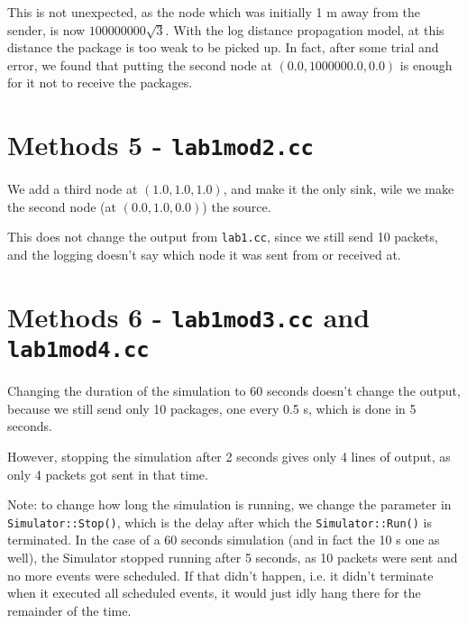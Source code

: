 \documentclass[11pt,journal]{article}
\begin{document}
	This is not unexpected, as the node which was initially 1 m away from the sender, is now $100000000 \sqrt{3}$. With the log distance propagation model, at this distance the package is too weak to be picked up. In fact, after some trial and error, we found that putting the second node at $(0.0,1000000.0, 0.0)$ is enough for it not to receive the packages.
	
	\section{Methods 5 - \texttt{lab1mod2.cc}}
	We add a third node at $(1.0, 1.0, 1.0)$, and make it the only sink, wile we make the second node (at $(0.0, 1.0, 0.0)$) the source.
	
	This does not change the output from \texttt{lab1.cc}, since we still send 10 packets, and the logging doesn't say which node it was sent from or received at.
	
	\section{Methods 6 - \texttt{lab1mod3.cc} and \texttt{lab1mod4.cc}}
	Changing the duration of the simulation to 60 seconds doesn't change the output, because we still send only 10 packages, one every 0.5 s, which is done in 5 seconds.
	
	However, stopping the simulation after 2 seconds gives only 4 lines of output, as only 4 packets got sent in that time. 
	
	Note: to change how long the simulation is running, we change the parameter in \texttt{Simulator::Stop()}, which is the delay after which the \texttt{Simulator::Run()} is terminated. In the case of a 60 seconds simulation (and in fact the 10 s one as well), the Simulator stopped running after 5 seconds, as 10 packets were sent and no more events were scheduled. If that didn't happen, i.e. it didn't terminate when it executed all scheduled events, it would just idly hang there for the remainder of the time.
	
	

	
\end{document}

